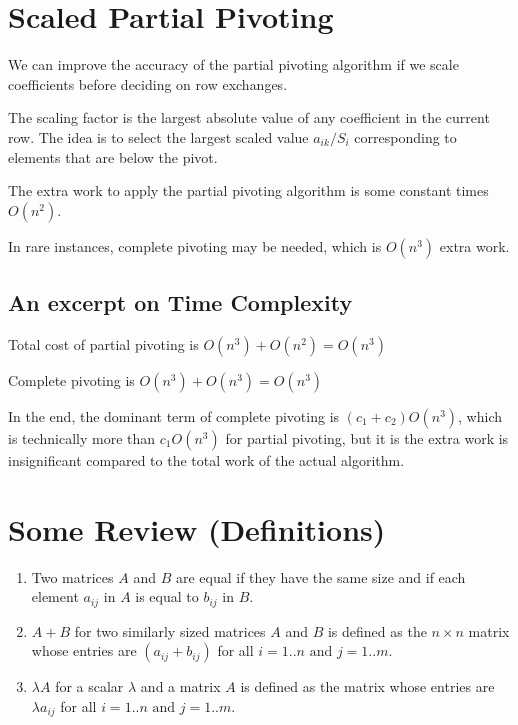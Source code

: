 \renewcommand{\arraystretch}{1.25} %
\setlength{\arraycolsep}{12pt}

\section{Scaled Partial Pivoting}

We can improve the accuracy of the partial pivoting algorithm if we scale 
coefficients before deciding on row exchanges.

The scaling factor is the largest absolute value of any coefficient in the 
current row. The idea is to select the largest scaled value $a_{ik}/S_i$
corresponding to elements that are below the pivot.

The extra work to apply the partial pivoting algorithm is some constant
times $O(n^2)$.

In rare instances, complete pivoting may be needed, which is $O(n^3)$ extra
work.

\subsection{An excerpt on Time Complexity}

Total cost of partial pivoting is $O(n^3) + O(n^2) = O(n^3)$

Complete pivoting is $O(n^3) + O(n^3) = O(n^3)$

In the end, the dominant term of complete pivoting is $(c_1 + c_2) O(n^3)$, 
which is technically more than $c_1 O(n^3)$ for partial pivoting, but it is
the extra work is insignificant compared to the total work of the actual 
algorithm.

\section{Some Review (Definitions)}

\begin{enumerate}
\item Two matrices $A$ and $B$ are equal if they have the same size and if each
  element $a_{ij}$ in $A$ is equal to $b_{ij}$ in $B$.
\item $A+B$ for two similarly sized matrices $A$ and $B$ is defined as
  the $n \times n$ matrix whose entries are $(a_{ij} + b_{ij})$ for all 
  $i = 1..n \text{ and } j = 1..m$.
\item $\lambda A$ for a scalar $\lambda$ and a matrix $A$ is defined as
  the matrix whose entries are $\lambda a_{ij}$ for all $i = 1..n \text{ and } 
  j = 1..m$.
\end{enumerate}

